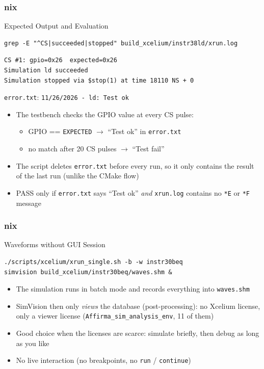 \documentclass{beamer}
\newcommand{\astitle}{nix}
\newcommand{\assubtitle}{nix}
\newcommand{\cmd}[1]{\texttt{#1}}
\begin{document}
\renewcommand{\assubtitle}{Expected Output and Evaluation}
\begin{frame}[fragile]
\frametitle{\astitle}
\begin{block}{\assubtitle}
\begin{lstlisting}[style=sh]
grep -E "^CS|succeeded|stopped" build_xcelium/instr38ld/xrun.log
\end{lstlisting}
\begin{lstlisting}
CS #1: gpio=0x26  expected=0x26
Simulation ld succeeded
Simulation stopped via $stop(1) at time 18110 NS + 0
\end{lstlisting}
  \cmd{error.txt}: \cmd{11/26/2026 - ld: Test ok}
  \footnotesize
  \begin{itemize}
    \item The testbench checks the GPIO value at every CS pulse:
    \begin{itemize}
      \item GPIO == \cmd{EXPECTED} $\rightarrow$ ``Test ok'' in \cmd{error.txt}
      \item no match after 20 CS pulses $\rightarrow$ ``Test fail''
    \end{itemize}
    \item The script deletes \cmd{error.txt} before every run, so it only
      contains the result of the last run (unlike the CMake flow)
    \item PASS only if \cmd{error.txt} says ``Test ok'' \emph{and}
      \cmd{xrun.log} contains no \cmd{*E} or \cmd{*F} message
  \end{itemize}
\end{block}
\end{frame}

\renewcommand{\assubtitle}{Waveforms without GUI Session}
\begin{frame}[fragile]
\frametitle{\astitle}
\begin{block}{\assubtitle}
\begin{lstlisting}[style=sh,basicstyle=\ttfamily\small]
./scripts/xcelium/xrun_single.sh -b -w instr30beq
simvision build_xcelium/instr30beq/waves.shm &
\end{lstlisting}
  \begin{itemize}
    \item The simulation runs in batch mode and records everything into \cmd{waves.shm}
    \item SimVision then only \emph{views} the database (post-processing):
      no Xcelium license, only a viewer license (\cmd{Affirma\_sim\_analysis\_env}, 11 of them)
    \item Good choice when the licenses are scarce: simulate briefly,
      then debug as long as you like
    \item No live interaction (no breakpoints, no \cmd{run} / \cmd{continue})
  \end{itemize}
\end{block}
\end{frame}
\end{document}
